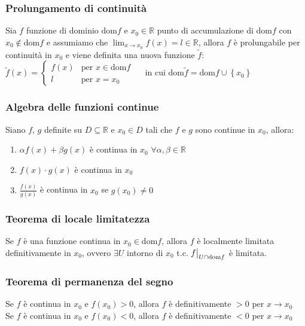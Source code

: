 \documentclass[a4paper]{article}
\newcommand\restr[2]{{%
	\left.\kern-\nulldelimiterspace %
	#1 %
	\vphantom{\big|} %
	\right|_{#2} %
	}}
\newcommand\dom{\text{dom}}
\begin{document}
\subsubsection*{Prolungamento di continuità}
Sia \(f\) funzione di dominio \(\dom f\) e \(x_0 \in \mathbb{R}\) punto di accumulazione di \(\dom f\) con \(x_0 \notin \dom f\)
e assumiamo che \(\displaystyle \lim_{x \to x_0} f(x) = l \in \mathbb{R}\), allora \(f\) è prolungabile per continuità in \(x_0\)
e viene definita una nuova funzione \(\widetilde{f}\): \\
\(\displaystyle \widetilde{f}(x) = \begin{cases}
	f(x) &\text{per } x \in \dom f \\
	l &\text{per } x = x_0
\end{cases} \quad\)
in cui \(\dom \widetilde{f} = \dom f \cup \left\{ x_0 \right\}\)

\subsubsection*{Algebra delle funzioni continue}
Siano \(f\), \(g\) definite su \(D \subseteq \mathbb{R}\) e \(x_0 \in D\) tali che \(f\) e \(g\) sono continue in \(x_0\), allora:
\begin{enumerate}
	\item \(\alpha f(x) + \beta g(x)\) è continua in \(x_0\) \(\forall \alpha, \beta \in \mathbb{R}\)
	\item \(f(x) \cdot g(x)\) è continua in \(x_0\)
	\item \(\displaystyle \frac{f(x)}{g(x)}\) è continua in \(x_0\) se \(g(x_0) \neq 0\)
\end{enumerate}

\subsubsection*{Teorema di locale limitatezza}
Se \(f\) è una funzione continua in \(x_0 \in \dom f\), allora \(f\) è localmente limitata definitivamente in \(x_0\), ovvero
\(\exists U\) intorno di \(x_0\) t.c. \(\restr{f}{U \cap \dom f}\) è limitata.

\subsubsection*{Teorema di permanenza del segno}
Se \(f\) è continua in \(x_0\) e \(f(x_0) > 0\), allora \(f\) è definitivamente \(> 0\) per \(x \to x_0\) \\
Se \(f\) è continua in \(x_0\) e \(f(x_0) < 0\), allora \(f\) è definitivamente \(< 0\) per \(x \to x_0\)
\end{document}
